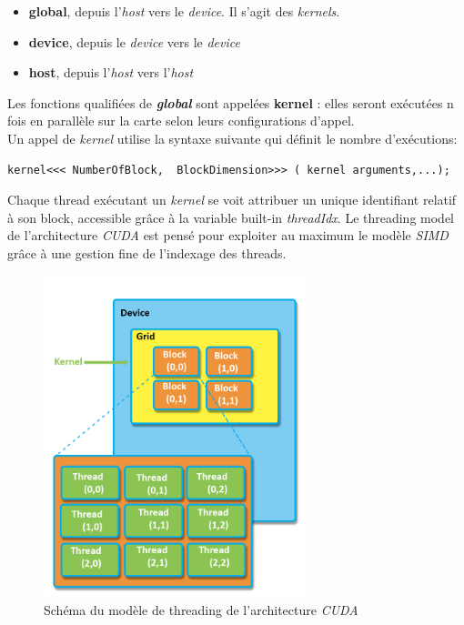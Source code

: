 \documentclass[french, 11pt]{memoir}
\begin{document}
\begin{itemize}
\item
  \textbf{global}, depuis l'\emph{host} vers le \emph{device}. Il s'agit
  des \emph{kernels}.
\item
  \textbf{device}, depuis le \emph{device} vers le \emph{device}
\item
  \textbf{host}, depuis l'\emph{host} vers l'\emph{host}
\end{itemize}

\bigskip
Les fonctions qualifiées de \emph{\textbf{global}} sont appelées
\textbf{kernel} : elles seront exécutées n fois en parallèle sur la
carte selon leurs configurations d'appel.\\
Un appel de \emph{kernel} utilise la syntaxe suivante qui définit le
nombre d'exécutions:

\begin{verbatim}
kernel<<< NumberOfBlock,  BlockDimension>>> ( kernel arguments,...);
\end{verbatim}

Chaque thread exécutant un \emph{kernel} se voit attribuer un unique
identifiant relatif à son block, accessible grâce à la variable
built-in \textit{threadIdx}. Le threading model de l'architecture \textit{CUDA}
est pensé pour exploiter au maximum le modèle \emph{SIMD} grâce à une
gestion fine de l'indexage des threads.

\begin{figure}[htbp]
	\begin{center}
		\includegraphics[width=3in]{img/cuda-threading.png}
		\caption{Schéma du modèle de threading de l'architecture \textit{CUDA}}
	\end{center}
\end{figure}
\end{document}
